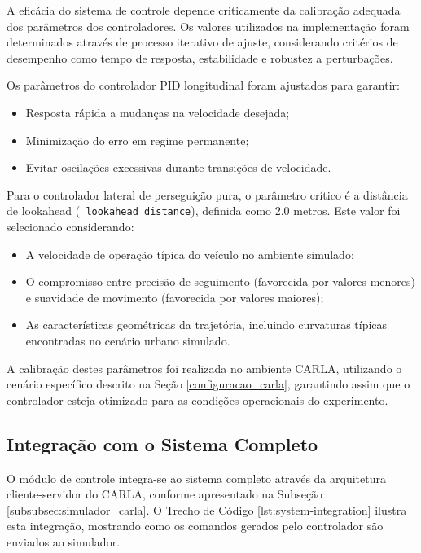 A eficácia do sistema de controle depende criticamente da calibração adequada dos parâmetros dos controladores. Os valores utilizados na implementação foram determinados através de processo iterativo de ajuste, considerando critérios de desempenho como tempo de resposta, estabilidade e robustez a perturbações.

Os parâmetros do controlador PID longitudinal foram ajustados para garantir:

\begin{itemize}
    \item Resposta rápida a mudanças na velocidade desejada;
    \item Minimização do erro em regime permanente;
    \item Evitar oscilações excessivas durante transições de velocidade.
\end{itemize}

Para o controlador lateral de perseguição pura, o parâmetro crítico é a distância de lookahead (\texttt{\_lookahead\_distance}), definida como 2.0 metros. Este valor foi selecionado considerando:

\begin{itemize}
    \item A velocidade de operação típica do veículo no ambiente simulado;
    \item O compromisso entre precisão de seguimento (favorecida por valores menores) e suavidade de movimento (favorecida por valores maiores);
    \item As características geométricas da trajetória, incluindo curvaturas típicas encontradas no cenário urbano simulado.
\end{itemize}

A calibração destes parâmetros foi realizada no ambiente CARLA, utilizando o cenário específico descrito na Seção \ref{configuracao_carla}, garantindo assim que o controlador esteja otimizado para as condições operacionais do experimento.

\subsection{Integração com o Sistema Completo}

O módulo de controle integra-se ao sistema completo através da arquitetura cliente-servidor do CARLA, conforme apresentado na Subseção \ref{subsubsec:simulador_carla}. O Trecho de Código \ref{lst:system-integration} ilustra esta integração, mostrando como os comandos gerados pelo controlador são enviados ao simulador.

